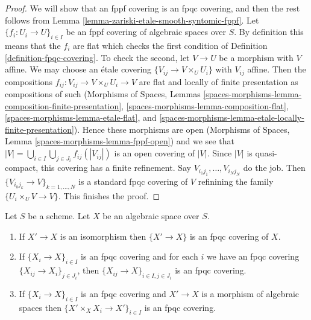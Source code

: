\begin{proof}
We will show that an fppf covering is an fpqc covering, and then the
rest follows from
Lemma \ref{lemma-zariski-etale-smooth-syntomic-fppf}.
Let $\{f_i : U_i \to U\}_{i \in I}$ be an
fppf covering of algebraic spaces over $S$.
By definition this means that the $f_i$ are flat which checks the first
condition of Definition \ref{definition-fpqc-covering}. To check the
second, let $V \to U$ be a morphism with $V$ affine.
We may choose an \'etale covering $\{V_{ij} \to V \times_U U_i\}$
with $V_{ij}$ affine. Then the compositions
$f_{ij} : V_{ij} \to V \times_U U_i \to V$ are flat and locally of
finite presentation as compositions of such
(Morphisms of Spaces, Lemmas
\ref{spaces-morphisms-lemma-composition-finite-presentation},
\ref{spaces-morphisms-lemma-composition-flat},
\ref{spaces-morphisms-lemma-etale-flat}, and
\ref{spaces-morphisms-lemma-etale-locally-finite-presentation}).
Hence these morphisms are open
(Morphisms of Spaces, Lemma \ref{spaces-morphisms-lemma-fppf-open})
and we see that
$|V| = \bigcup_{i \in I} \bigcup_{j \in J_i} f_{ij}(|V_{ij}|)$
is an open covering of $|V|$.
Since $|V|$ is quasi-compact, this covering has a finite
refinement.
Say $V_{i_1j_1}, \ldots, V_{i_Nj_N}$ do the job.
Then $\{V_{i_kj_k} \to V\}_{k = 1, \ldots, N}$ is
a standard fpqc covering of $V$ refinining the family
$\{U_i \times_U V \to V\}$.
This finishes the proof.
\end{proof}

\begin{lemma}
\label{lemma-fpqc}
Let $S$ be a scheme.
Let $X$ be an algebraic space over $S$.
\begin{enumerate}
\item If $X' \to X$ is an isomorphism then $\{X' \to X\}$
is an fpqc covering of $X$.
\item If $\{X_i \to X\}_{i\in I}$ is an fpqc covering and for each
$i$ we have an fpqc covering $\{X_{ij} \to X_i\}_{j\in J_i}$, then
$\{X_{ij} \to X\}_{i \in I, j\in J_i}$ is an fpqc covering.
\item If $\{X_i \to X\}_{i\in I}$ is an fpqc covering
and $X' \to X$ is a morphism of algebraic spaces then
$\{X' \times_X X_i \to X'\}_{i\in I}$ is an fpqc covering.
\end{enumerate}
\end{lemma}


